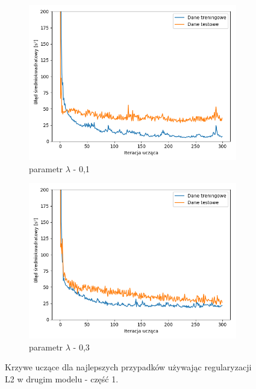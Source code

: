 \documentclass[12pt]{aghdpl}
\begin{document}
		\begin{figure}[h]
			\centering
		 	\begin{subfigure}{.8\linewidth}
		 		\includegraphics[width =\linewidth]{wykresy/6_regularyzacja/l2/regularyzacja_0_1_wykres_uczenia.png}
		 		\caption{parametr $\lambda$ - 0,1}
		 	\end{subfigure}
		 	\begin{subfigure}{.8\linewidth}
		 		\includegraphics[width =\linewidth]{wykresy/6_regularyzacja/l2/regularyzacja_0_3_wykres_uczenia.png}
		 		\caption{parametr $\lambda$ - 0,3}
		 	\end{subfigure}
		 	
		 	\caption{Krzywe uczące dla najlepszych przypadków używając regularyzacji L2 w drugim modelu - część 1.}
			\label{fig: drugi_model_przy_regularyzacji_l2_wykresy_uczenia_1}
		\end{figure}
		 	
\end{document}
